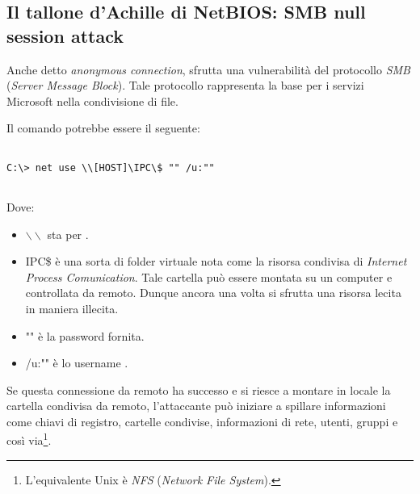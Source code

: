 \documentclass[14pt]{extreport}
\begin{document}
\subsection{Il tallone d'Achille di NetBIOS: SMB null session attack}

Anche detto \textit{anonymous connection}, sfrutta una vulnerabilità del protocollo \textit{SMB} (\textit{Server Message Block}). Tale protocollo rappresenta la base per i servizi Microsoft nella condivisione di file.

Il comando potrebbe essere il seguente:

\vspace{5pt}

{
\small
\begin{tcolorbox}

\begin{verbatim}

C:\> net use \\[HOST]\IPC\$ "" /u:""
  
\end{verbatim}

\end{tcolorbox}
}

\vspace{5pt}


Dove:

\begin{itemize}
    \item $\backslash \backslash$ sta per .
    
    \item IPC\$ è una sorta di folder virtuale nota come la risorsa condivisa di \textit{Internet Process Comunication}. Tale cartella può essere montata su un computer e controllata da remoto. Dunque ancora una volta si sfrutta una risorsa lecita in maniera illecita.
    
    \item "" è la password  fornita.
    
    \item /u:"" è lo username .
\end{itemize}

Se questa connessione da remoto ha successo e si riesce a montare in locale la cartella condivisa da remoto, l'attaccante può iniziare a spillare informazioni come chiavi di registro, cartelle condivise, informazioni di rete, utenti, gruppi e così via\footnote{L'equivalente Unix è \textit{NFS} (\textit{Network File System}).}.
\end{document}
